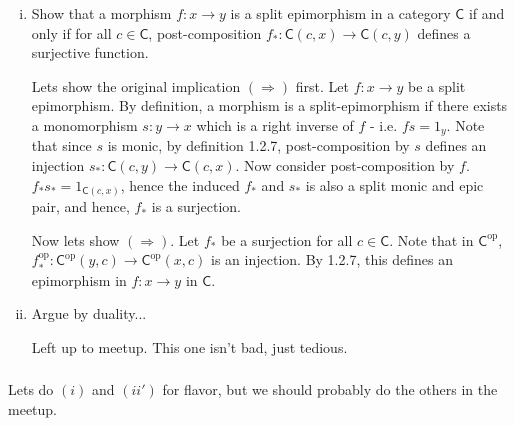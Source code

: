 \documentclass[10pt, oneside]{article}   	%
\newcommand{\cat}[1]{\bm{ \mathsf{#1} }}
\newcommand{\cc}{\cat{C}}
\newcommand{\op}[1]{#1^{\text{op}}}
\newcommand{\opc}{\op{\cc}}
\begin{document}
\subsubsection{}
\begin{enumerate}[(i)]

\item Show that a morphism $f: x \to y$ is a split epimorphism in a category $\cc$ if and only if for all $c \in \cc$, post-composition $f_*: \cc(c,x) \to \cc(c,y)$ defines a surjective function. 

Lets show the original implication $(\Rightarrow)$ first. Let $f : x \to y$ be a split epimorphism. By definition, a morphism is a split-epimorphism if there exists a monomorphism $s : y \to x$ which is a right inverse of $f$ - i.e. $fs = 1_y$.  Note that since $s$ is monic, by definition 1.2.7, post-composition by $s$ defines an injection $s_* : \cc(c,y) \to \cc(c, x)$. Now consider post-composition by $f$. $f_*s_* = 1_{\cc(c,x)}$, hence the induced $f_*$ and $s_*$ is also a split monic and epic pair, and hence, $f_*$ is a surjection. 

Now lets show $(\Rightarrow)$. Let $f_*$ be a surjection for all $c \in \cc$. Note that in $\opc$, $\op{f_*} : \opc(y,c) \to \opc(x,c)$ is an injection. By 1.2.7, this defines an epimorphism in $f: x \to y$ in $\cc$.

\item Argue by duality... 

Left up to meetup. This one isn't bad, just tedious.

\end{enumerate}

\subsubsection{}

Lets do $(i)$ and $(ii')$ for flavor, but we should probably do the others in the meetup.
\end{document}
